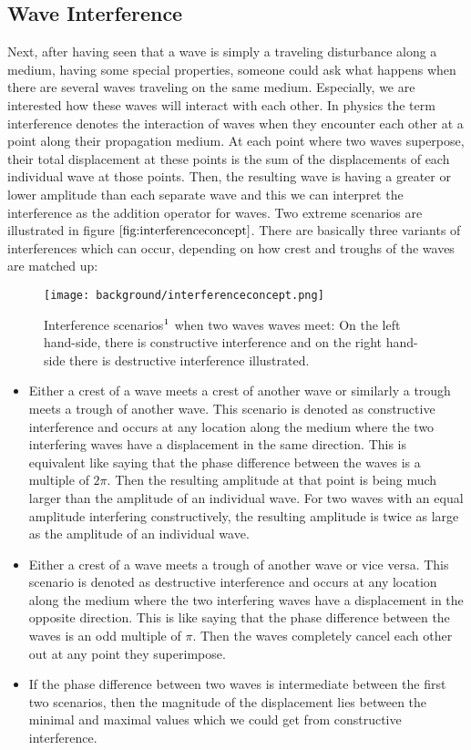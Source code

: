 \subsection{Wave Interference}
Next, after having seen that a wave is simply a traveling disturbance along a medium, having some special properties, someone could ask what happens when there are several waves traveling on the same medium. Especially, we are interested how these waves will interact with each other. In physics the term interference denotes the interaction of waves when they encounter each other at a point along their propagation medium. At each point where two waves superpose, their total displacement at these points is the sum of the displacements of each individual wave at those points. Then, the resulting wave is having a greater or lower amplitude than each separate wave and this we can interpret the interference as the addition operator for waves. Two extreme scenarios are illustrated in figure $\ref{fig:interferenceconcept}$. There are basically three variants of interferences which can occur, depending on how crest and troughs of the waves are matched up:

\begin{figure}[H]
  \centering
  \texttt{[image: background/interferenceconcept.png]}
  \caption[interference]{Interference scenarios$\footnotemark$ when two waves waves meet: On the left hand-side, there is constructive interference and on the right hand-side there is destructive interference illustrated.}
  \label{fig:interferenceconcept}
\end{figure}

\begin{itemize}
  \item Either a crest of a wave meets a crest of another wave or similarly a trough meets a trough of another wave. This scenario is denoted as constructive interference and occurs at any location along the medium where the two interfering waves have a displacement in the same direction. This is equivalent like saying that the phase difference between the waves is a multiple of $2\pi$. Then the resulting amplitude at that point is being much larger than the amplitude of an individual wave. For two waves with an equal amplitude interfering constructively, the resulting amplitude is twice as large as the amplitude of an individual wave.
  \item Either a crest of a wave meets a trough of another wave or vice versa. This scenario is denoted as destructive interference and occurs at any location along the medium where the two interfering waves have a displacement in the opposite direction. This is like saying that the phase difference between the waves is an odd multiple of $\pi$. Then the waves completely cancel each other out at any point they superimpose.
  \item If the phase difference between two waves is intermediate between the first two scenarios, then the magnitude of the displacement lies between the minimal and maximal values which we could get from constructive interference.
\end{itemize}

